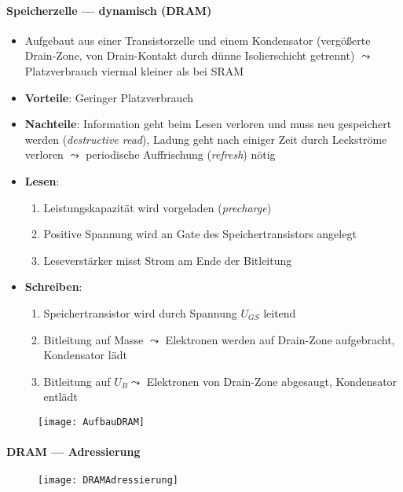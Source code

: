 \paragraph{Speicherzelle --- dynamisch (DRAM)}
\begin{itemize}
	\item Aufgebaut aus einer Transistorzelle und einem Kondensator (vergößerte Drain-Zone, von Drain-Kontakt durch dünne Isolierschicht getrennt) \( \leadsto \) Platzverbrauch viermal kleiner als bei SRAM
	\item \textbf{Vorteile}: Geringer Platzverbrauch
	\item \textbf{Nachteile}: Information geht beim Lesen verloren und muss neu gespeichert werden (\emph{destructive read}), Ladung geht nach einiger Zeit durch Leckströme verloren \( \leadsto \) periodische Auffrischung (\emph{refresh}) nötig
	\item \textbf{Lesen}:
	\begin{enumerate}
		\item Leistungskapazität wird vorgeladen (\emph{precharge})
		\item Positive Spannung wird an Gate des Speichertransistors angelegt
		\item Leseverstärker misst Strom am Ende der Bitleitung
	\end{enumerate}
	\item \textbf{Schreiben}: 
	\begin{enumerate}
		\item Speichertransistor wird durch Spannung \( U_{GS} \) leitend
		\item Bitleitung auf Masse  \( \leadsto \) Elektronen werden auf Drain-Zone aufgebracht, Kondensator lädt
		\item Bitleitung auf \( U_B \leadsto \) Elektronen von Drain-Zone abgesaugt, Kondensator entlädt 
	\end{enumerate}
\end{itemize}
\begin{figure}[H]\centering\label{AufbauDRAM}\texttt{[image: AufbauDRAM]}\end{figure}

\paragraph{DRAM --- Adressierung}
\begin{figure}[H]\centering\label{DRAMAdressierung}\texttt{[image: DRAMAdressierung]}\end{figure}

